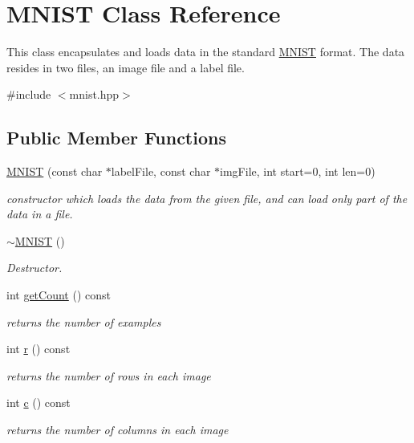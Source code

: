 \hypertarget{classMNIST}{}\section{M\+N\+I\+ST Class Reference}
\label{classMNIST}


This class encapsulates and loads data in the standard \hyperlink{classMNIST}{M\+N\+I\+ST} format. The data resides in two files, an image file and a label file.  




{\ttfamily \#include $<$mnist.\+hpp$>$}

\subsection*{Public Member Functions}
\begin{DoxyCompactItemize}
\item 
\hyperlink{classMNIST_a073d6d94e86b7ff7bfbac9fbb437c3fa}{M\+N\+I\+ST} (const char $\ast$label\+File, const char $\ast$img\+File, int start=0, int len=0)
\begin{DoxyCompactList}\small\item\em constructor which loads the data from the given file, and can load only part of the data in a file. \end{DoxyCompactList}\item 
\hyperlink{classMNIST_ac89c59ef390f3d253972025f99cabb35}{$\sim$\+M\+N\+I\+ST} ()
\begin{DoxyCompactList}\small\item\em Destructor. \end{DoxyCompactList}\item 
int \hyperlink{classMNIST_aa88f6fd8a94bbb9a6de1027482e5f5e9}{get\+Count} () const 
\begin{DoxyCompactList}\small\item\em returns the number of examples \end{DoxyCompactList}\item 
int \hyperlink{classMNIST_a27b60339e8f13efab77091cc635fbc2b}{r} () const 
\begin{DoxyCompactList}\small\item\em returns the number of rows in each image \end{DoxyCompactList}\item 
int \hyperlink{classMNIST_a61776484e4ded23d1136d58083077dcd}{c} () const 
\begin{DoxyCompactList}\small\item\em returns the number of columns in each image \end{DoxyCompactList}\item 

\end{DoxyCompactItemize}
